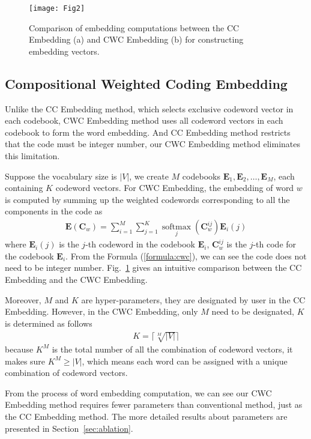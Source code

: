 \documentclass[times,twocolumn,final]{elsarticle}
\begin{document}
\begin{figure}
  \centering
  \texttt{[image: Fig2]}
  \caption{Comparison of embedding computations between the CC Embedding (a) and CWC Embedding (b) for constructing embedding vectors.}
  \label{embedding_layer}
\end{figure}

\subsection{Compositional Weighted Coding Embedding}

Unlike the CC Embedding method, which selects exclusive codeword vector in each codebook, CWC Embedding method uses all codeword vectors in each codebook to form the word embedding. And CC Embedding method restricts that the code must be integer number, our CWC Embedding method eliminates this limitation.

Suppose the vocabulary size is $\vert V \vert$, we create $M$ codebooks $\mathbf{E}_1, \mathbf{E}_2,\dots,\mathbf{E}_M$, each containing $K$ codeword vectors. For CWC Embedding, the embedding of word $w$ is computed by summing up the weighted codewords corresponding to all the components in the code as
    \begin{align}
    \label{formula:cwc}
      \mathbf{E}(\mathbf{C}_w) = \sum_{i=1}^M \sum_{j=1}^K \mathop{softmax}\limits_j (\mathbf{C}_w^{ij})\mathbf{E}_i(j)
    \end{align}
where $\mathbf{E}_i(j)$ is the $j$-th codeword in the codebook $\mathbf{E}_i$, $\mathbf{C}_w^{ij}$ is the $j$-th code for the codebook $\mathbf{E}_i$. From the Formula (\ref{formula:cwc}), we can see the code does not need to be integer number. Fig.~\ref{embedding_layer} gives an intuitive comparison between the CC Embedding and the CWC Embedding. 

Moreover, $M$ and $K$ are hyper-parameters, they are designated by user in the CC Embedding. However, in the CWC Embedding, only $M$ need to be designated, $K$ is determined as follows
    \begin{align}
      K = \lceil\sqrt[M]{\vert V \vert}\rceil
    \end{align}
because $K^M$ is the total number of all the combination of codeword vectors, it makes sure $K^M \geq \vert V \vert$, which means each word can be assigned with a unique combination of codeword vectors.

From the process of word embedding computation, we can see our CWC Embedding method requires fewer parameters than conventional method, just as the CC Embedding method. The more detailed results about parameters are presented in Section~\ref{sec:ablation}.
\end{document}
